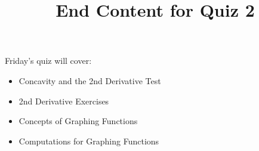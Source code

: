 \documentclass{ximera}
\title{End Content for Quiz 2}
\begin{document}
\begin{abstract}
\end{abstract}

\maketitle

\begin{sectionOutcomes}

Friday's quiz will cover:



\begin{itemize}
\item Concavity and the 2nd Derivative Test
\item 2nd Derivative Exercises
\item Concepts of  Graphing Functions
\item Computations for Graphing Functions
\end{itemize}

\end{sectionOutcomes}
\end{document}
